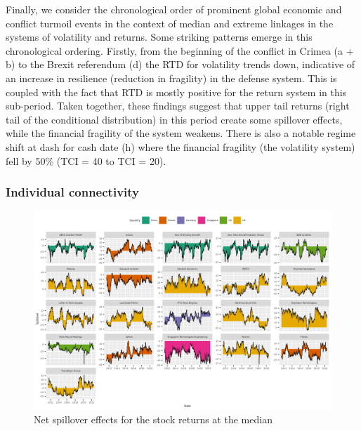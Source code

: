 \documentclass[
  letterpaper,
  DIV=11,
  numbers=noendperiod]{scrartcl}
\begin{document}
Finally, we consider the chronological order of prominent global
economic and conflict turmoil events in the context of median and
extreme linkages in the systems of volatility and returns. Some striking
patterns emerge in this chronological ordering. Firstly, from the
beginning of the conflict in Crimea (a + b) to the Brexit referendum (d)
the RTD for volatility trends down, indicative of an increase in
resilience (reduction in fragility) in the defense system. This is
coupled with the fact that RTD is mostly positive for the return system
in this sub-period. Taken together, these findings suggest that upper
tail returns (right tail of the conditional distribution) in this period
create some spillover effects, while the financial fragility of the
system weakens. There is also a notable regime shift at dash for cash
date (h) where the financial fragility (the volatility system) fell by
50\% (TCI = 40 to TCI = 20).

\hypertarget{individual-connectivity}{%
\subsubsection{Individual connectivity}\label{individual-connectivity}}

\begin{figure}[H]

{\centering \includegraphics[width=1\textwidth,height=\textheight]{plots/fig-rtnnet50.png}

}

\caption{\label{fig-rtnet50}Net spillover effects for the stock returns
at the median}

\end{figure}
\end{document}
